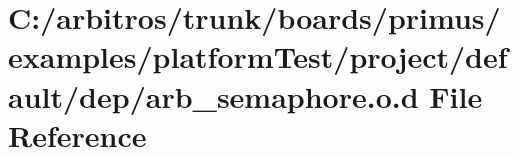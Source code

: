 \hypertarget{platform_test_2project_2default_2dep_2arb__semaphore_8o_8d}{\section{C\-:/arbitros/trunk/boards/primus/examples/platform\-Test/project/default/dep/arb\-\_\-semaphore.o.\-d File Reference}
\label{platform_test_2project_2default_2dep_2arb__semaphore_8o_8d}
}
